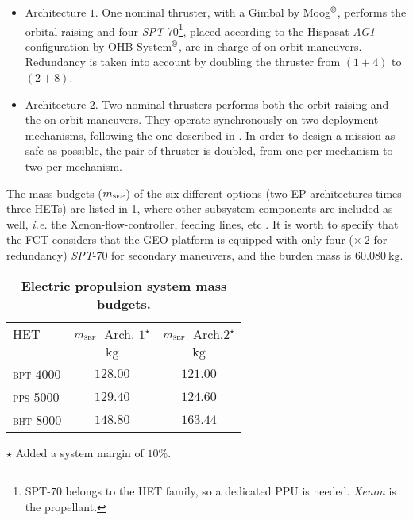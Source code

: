 \begin{itemize}
\item Architecture $1$. One nominal thruster, with a Gimbal by Moog$^\copyright$, performs the orbital raising and four  \textit{SPT}-70\footnote{SPT-$70$ belongs to the HET family, so a dedicated PPU is needed. \emph{Xenon} is the propellant.}\cite{}, placed according to the Hispasat \textit{AG1} configuration by OHB System$^\copyright$, are in charge of on-orbit maneuvers. Redundancy is taken into account by doubling the thruster from $\left(1+4\right)$ to $\left(2+8\right)$.
\item Architecture $2$. Two nominal thrusters performs both the orbit raising and the on-orbit maneuvers. They operate synchronously on two deployment mechanisms, following the one described in \cite{corey2010performance}. In order to design a mission as safe as possible, the pair of thruster is doubled, from one per-mechanism to two per-mechanism.
\end{itemize}
The mass budgets ($m_{\scriptstyle{\textsc{sep}}}$) of the six different options (two EP architectures times three HETs) are listed in \tablename\ref{tab:sepmassbudgets}, where other subsystem components are included as well, \textit{i.e.} the Xenon-flow-controller, feeding lines, etc \cite{tesisimo}.
It is worth to specify that the FCT considers that the GEO platform is equipped with only four ($\times~2$ for redundancy) \textit{SPT}-70 for secondary maneuvers, and the burden mass is $60.080~\si{\kilo\gram}$.
%
\begin{table}[htp]
\caption{\textbf{Electric propulsion system mass budgets.}}
\label{tab:electricpropulsionsystemmassbudgets}
\centering
\small
\begin{threeparttable}
\begin{tabular}{lcc}
\toprule
\toprule
HET&$m_{\scriptstyle{\textsc{sep}}}$~Arch. $1^{\star}$&$m_{\scriptstyle{\textsc{sep}}}$~Arch.$2^{\star}$ \\
&$\si{\kilo\gram}$&$\si{\kilo\gram}$\\
\midrule
\textsc{bpt}-$4000$&$128.00$&$121.00$\\
\textsc{pps}-$5000$&$129.40$&$124.60$\\
\textsc{bht}-$8000$&$148.80$&$163.44$\\
\bottomrule
\bottomrule
\end{tabular}
\begin{tablenotes}
\small
\item[$\star$] Added a system margin of $10\%$.
\end{tablenotes}
\end{threeparttable}
\label{tab:sepmassbudgets}
\end{table}
%
